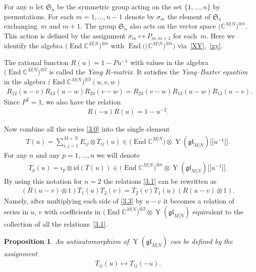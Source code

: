 \documentclass[10pt,a4paper]{amsart}
\numberwithin{equation}{section}
\newtheorem{Proposition}[Theorem]{Proposition}
\def\1{^{-1}}
\def\CC{{\mathbb{C}}}
\def\CMN{\CC^{M|N}}
\def\End{\operatorname{End}}
\def\glMN{\mathfrak{gl}_{M|N}}
\def\id{{\mathrm{id}}}
\def\ot{\otimes}
\def\si{\sigma}
\def\Sym{\mathfrak{S}}
\def\YMN{\operatorname{Y}(\glMN)}
\begin{document}
For any $n$ let $\Sym_n$ be the symmetric group acting
on the set $\{1,\dots, n\}$ by permutations. For each $m=1,\dots, n-1$
denote by $\si_m$ the element of $\Sym_n$ exchanging~$m$ and $m+1 $.
The group $\Sym_n$ also acts on the vector space $\big(\CMN\big)^{\ot n}$.
This action is defined by the assignment
$\si_m\mapsto P_{m,m+1}$ for each~$m $.
Here we identify the algebra
$\big(\End\CMN\big)^{\ot n}$ with $\End\big(\big(\CMN\big)^{\ot n}\big)$ via~\eqref{XY},~\eqref{xy}.

The rational function $R(u)=1-P u\1$ with values in the algebra
$\big(\End\CMN\big)^{\ot 2}$ is called the {\it Yang $R$-matrix}.
It satisfies the {\it Yang--Baxter equation}
in the algebra $\big(\End\CMN\big)^{\ot 3}(u,v,w)$
\begin{gather}\label{3.6}
R_{12}(u-v) R_{13}(u-w) R_{23}(v-w)=R_{23}(v-w) R_{13}(u-w) R_{12}(u-v) .
\end{gather}
Since $P^2=1 $, we also have the relation
\begin{gather}\label{3.52}
R(-u) R(u)=1-u^{-2} .
\end{gather}

Now combine all the series \eqref{3.0} into the single element
\begin{gather}\label{tu}
T(u)=\sum_{i,j=1}^{M+N} E_{ij}\ot T_{ij}(u)
\in\big(\End\CMN\big)\ot\YMN \big[\big[u^{-1}\big]\big] .
\end{gather}
For any $n$ and any $p=1,\dots, n$ we will denote
\begin{gather}
T_p(u)=\iota_p\ot\id ( T(u)) \in\big(\End\CMN\big)^{\ot n}\ot\YMN \big[\big[u\1\big]\big] .\label{3.22}
\end{gather}
By using this notation for $n=2$
the relations \eqref{3.1} can be rewritten as
\begin{gather}\label{3.3}
(R (u-v)\ot1) T_1(u) T_2(v)=T_2(v) T_1(u) (R (u-v)\ot1) .
\end{gather}
Namely, after multiplying each side of \eqref{3.3} by $u-v$ it becomes
a relation of series in $u$, $v$ with coefficients in %
$\big(\End\CMN\big)^{\ot 2}\ot\YMN$
equivalent to the collection of all the relations~\eqref{3.1}.

\begin{Proposition}\label{m}
An antiautomorphism of $\YMN$ can be defined by the assignment
\begin{gather}\label{M}
T_{ij}(u)\mapsto T_{ij}(-u) .
\end{gather}
\end{Proposition}
\end{document}
